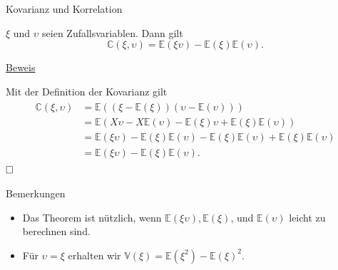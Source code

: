 \documentclass[
  8pt,
  ignorenonframetext,
]{beamer}
\providecommand{\tightlist}{%
  \setlength{\itemsep}{0pt}\setlength{\parskip}{0pt}}
\newcommand{\ups}{\upsilon}
\begin{document}
\begin{frame}{Kovarianz und Korrelation}
\protect\hypertarget{kovarianz-und-korrelation-3}{}
\begin{theorem}[Kovarianzverschiebungssatz]
\normalfont
\justifying
$\xi$ und $\ups$ seien Zufallsvariablen. Dann gilt
\begin{equation}
\mathbb{C}(\xi,\ups) = \mathbb{E}(\xi\ups) - \mathbb{E}(\xi)\mathbb{E}(\ups).
\end{equation}
\end{theorem}

\footnotesize

\underline{Beweis}

Mit der Definition der Kovarianz gilt \begin{align}
\begin{split}
\mathbb{C}(\xi,\ups)
& = \mathbb{E}\left((\xi - \mathbb{E}(\xi))(\ups - \mathbb{E}(\ups))\right)                                             \\
& = \mathbb{E}\left(X\ups - X \mathbb{E}(\ups) - \mathbb{E}(\xi)\ups  + \mathbb{E}(\xi) \mathbb{E}(\ups)\right)             \\
& = \mathbb{E}(\xi\ups) - \mathbb{E}(\xi)\mathbb{E}(\ups) - \mathbb{E}(\xi)\mathbb{E}(\ups) + \mathbb{E}(\xi) \mathbb{E}(\ups)  \\
& = \mathbb{E}(\xi\ups) - \mathbb{E}(\xi)\mathbb{E}(\ups).
\end{split}
\end{align} \(\hfill \Box\)

\footnotesize

Bemerkungen

\justifying

\begin{itemize}
\tightlist
\item
  Das Theorem ist nützlich, wenn
  \(\mathbb{E}(\xi\ups),\mathbb{E}(\xi)\), und \(\mathbb{E}(\ups)\)
  leicht zu berechnen sind.
\item
  Für \(\ups = \xi\) erhalten wir
  \(\mathbb{V}(\xi) = \mathbb{E}(\xi^2) - \mathbb{E}(\xi)^2\).
\end{itemize}
\end{frame}
\end{document}

